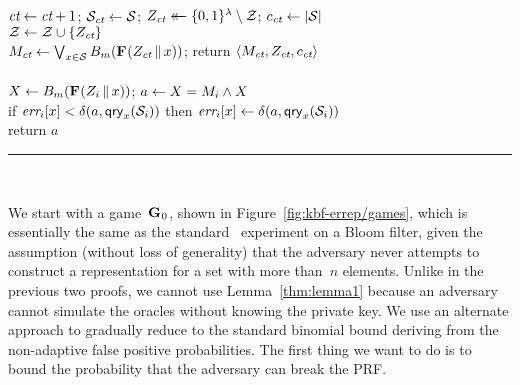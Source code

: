 \begin{figure*}[t]
{    $\textit{ct} \gets \textit{ct}+1$;
    $\mathcal{S}_{\textit{ct}} \gets \mathcal{S}$;
    $Z_{\textit{ct}} \mathrel{\leftarrow\mkern-14mu\leftarrow} \{0,1\}^\lambda \setminus \mathcal{Z}$;
    $c_{\textit{ct}} \gets |\mathcal{S}|$\\
    $\mathcal{Z} \gets \mathcal{Z} \cup \{Z_{\textit{ct}}\}$\\
    $M_{\textit{ct}} \gets \bigvee_{x \in \mathcal{S}} {B}_m(\textup{\textbf{F}}\hspace{0.5pt}(Z_{\textit{ct}} \, \| \, x))$;
    return $\langle M_{\textit{ct}}, Z_{\textit{ct}}, c_{\textit{ct}} \rangle$
  \\[6pt]
  \\[2pt]
    $X \gets {B}_m(\textup{\textbf{F}}\hspace{0.5pt}(Z_i \, \| \, x))$;
    $a \gets X = M_i \wedge X$\\
    if $\textit{err}_i[x] < \delta(a,\mathsf{qry}_x(\mathcal{S}_i))$ then
          $\textit{err}_i[x] \gets \delta(a,\mathsf{qry}_x(\mathcal{S}_i))$\\
    return $a$
  \\[4pt]
  \hrule
  \vspace{2pt}
  \hfill{}\\[2pt]
}
\caption{Games 0--4 for proof of Theorem~\ref{thm:bf-key-bound}.}
\label{fig:kbf-errep/games}
\end{figure*}

We start with a game~$\textup{\textbf{G}}\hspace{0.5pt}_0$, shown in Figure~\ref{fig:kbf-errep/games}, which is essentially the same as the standard
\errep\ experiment on a Bloom filter, given the assumption (without loss of
generality) that the adversary never attempts to construct a representation for
a set with more than~$n$ elements.
%
%
Unlike in the previous two proofs, we cannot use Lemma~\ref{thm:lemma1} because
an adversary cannot simulate the oracles without knowing the private key. We use
an alternate approach to gradually reduce to the standard binomial bound
deriving from the non-adaptive false positive probabilities. The first thing we
want to do is to bound the probability that the adversary can break the PRF.

